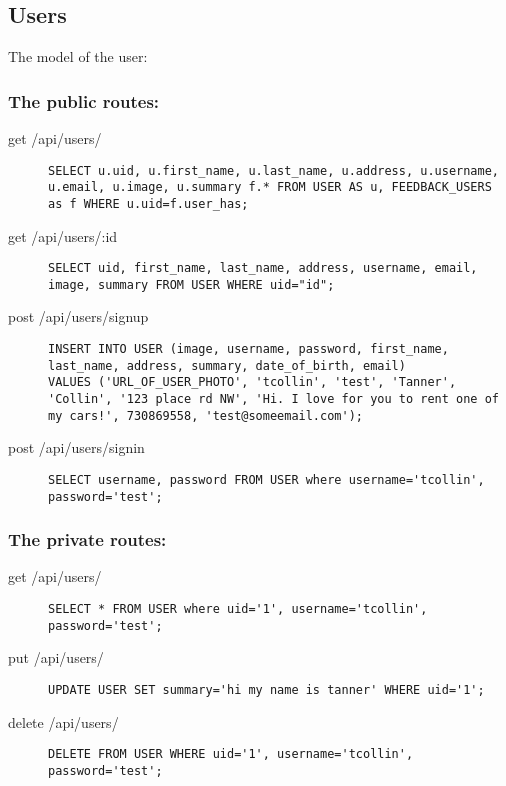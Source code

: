 \documentclass{article}
\begin{document}
\subsection{Users}
The model of the user:

\subsubsection{The public routes:}
\begin{description}
\item[get /api/users/] \mbox{}
\begin{lstlisting}
SELECT u.uid, u.first_name, u.last_name, u.address, u.username, u.email, u.image, u.summary f.* FROM USER AS u, FEEDBACK_USERS as f WHERE u.uid=f.user_has;
\end{lstlisting}


\item[get /api/users/:id] \mbox{}
\begin{lstlisting}
SELECT uid, first_name, last_name, address, username, email, image, summary FROM USER WHERE uid="id";
\end{lstlisting}

\item[post /api/users/signup] \mbox{}
\begin{lstlisting}
INSERT INTO USER (image, username, password, first_name, last_name, address, summary, date_of_birth, email)
VALUES ('URL_OF_USER_PHOTO', 'tcollin', 'test', 'Tanner', 'Collin', '123 place rd NW', 'Hi. I love for you to rent one of my cars!', 730869558, 'test@someemail.com');
\end{lstlisting}

\item[post /api/users/signin] \mbox{}
\begin{lstlisting}
SELECT username, password FROM USER where username='tcollin', password='test';
\end{lstlisting}
\end{description}

\subsubsection{The private routes:}
\begin{description}
\item[get /api/users/] \mbox{}
\begin{lstlisting}
SELECT * FROM USER where uid='1', username='tcollin', password='test';
\end{lstlisting}

\item[put /api/users/] \mbox{}
\begin{lstlisting}
UPDATE USER SET summary='hi my name is tanner' WHERE uid='1';
\end{lstlisting}

\item[delete /api/users/] \mbox{}
\begin{lstlisting}
DELETE FROM USER WHERE uid='1', username='tcollin', password='test';
\end{lstlisting}
\end{description}
\end{document}
